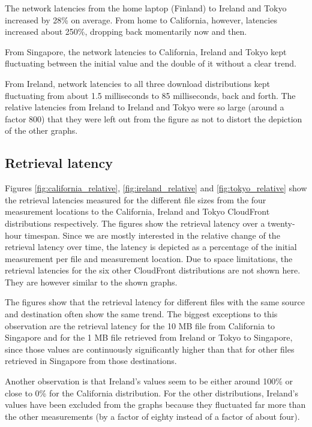 \documentclass[conference]{IEEEtran}
\begin{document}
The network latencies from the home laptop (Finland) to Ireland and Tokyo increased by 28\% on average. From home to California, however, latencies increased about 250\%, dropping back momentarily now and then.

From Singapore, the network latencies to California, Ireland and Tokyo kept fluctuating between the initial value and the double of it without a clear trend.

From Ireland, network latencies to all three download distributions kept fluctuating from about 1.5 milliseconds to 85 milliseconds, back and forth. The relative latencies from Ireland to Ireland and Tokyo were so large (around a factor 800) that they were left out from the figure as not to distort the depiction of the other graphs.

\subsection{Retrieval latency}
Figures \ref{fig:california_relative}, \ref{fig:ireland_relative} and \ref{fig:tokyo_relative} show the retrieval latencies measured for the different file sizes from the four measurement locations to the California, Ireland and Tokyo CloudFront distributions respectively. The figures show the retrieval latency over a twenty-hour timespan. Since we are mostly interested in the relative change of the retrieval latency over time, the latency is depicted as a percentage of the initial measurement per file and measurement location. Due to space limitations, the retrieval latencies for the six other CloudFront distributions are not shown here. They are however similar to the shown graphs. %

The figures show that the retrieval latency for different files with the same source and destination often show the same trend. The biggest exceptions to this observation are the retrieval latency for the 10 MB file from California to Singapore and for the 1 MB file retrieved from Ireland or Tokyo to Singapore, since those values are continuously significantly higher than that for other files retrieved in Singapore from those destinations.

Another observation is that Ireland's values seem to be either around 100\% or close to 0\% for the California distribution. For the other distributions, Ireland's values have been excluded from the graphs because they fluctuated far more than the other measurements (by a factor of eighty instead of a factor of about four).
\end{document}
